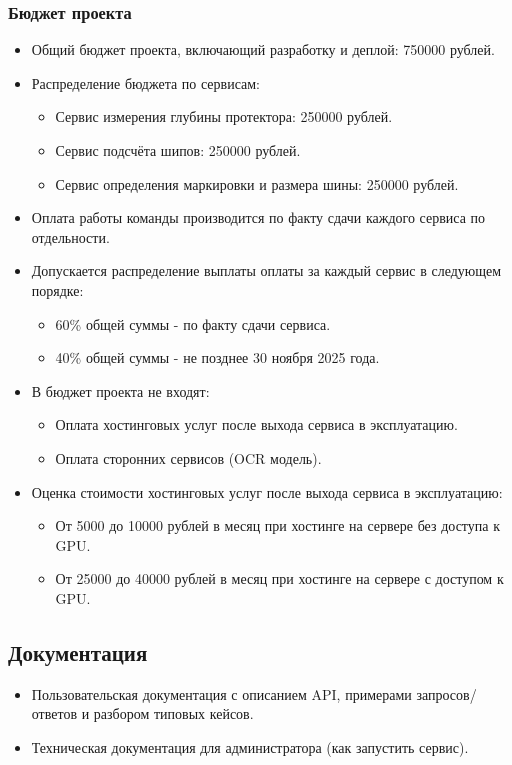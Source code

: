 \documentclass[12pt]{article}
\begin{document}
\subsubsection{Бюджет проекта}
\begin{itemize}
	\item Общий бюджет проекта, включающий разработку и деплой: 750000 рублей.
	\item Распределение бюджета по сервисам:
	      \begin{itemize}
		      \item Сервис измерения глубины протектора: 250000 рублей.
		      \item Сервис подсчёта шипов: 250000 рублей.
		      \item Сервис определения маркировки и размера шины: 250000 рублей.
	      \end{itemize}
	\item Оплата работы команды производится по факту сдачи каждого сервиса по отдельности.
	\item Допускается распределение выплаты оплаты за каждый сервис в следующем порядке:
	      \begin{itemize}
		      \item 60\% общей суммы - по факту сдачи сервиса.
		      \item 40\% общей суммы - не позднее 30 ноября 2025 года.
	      \end{itemize}
	\item В бюджет проекта не входят:
	      \begin{itemize}
		      \item Оплата хостинговых услуг после выхода сервиса в эксплуатацию.
		      \item Оплата сторонних сервисов (OCR модель).
	      \end{itemize}
	\item Оценка стоимости хостинговых услуг после выхода сервиса в эксплуатацию:
	      \begin{itemize}
		      \item От 5000 до 10000 рублей в месяц при хостинге на сервере без доступа к GPU.
		      \item От 25000 до 40000 рублей в месяц при хостинге на сервере с доступом к GPU.
	      \end{itemize}
\end{itemize}


\subsection{Документация}
\begin{itemize}
	\item Пользовательская документация с описанием API, примерами запросов/ответов и разбором типовых кейсов.
	\item Техническая документация для администратора (как запустить сервис).
\end{itemize}
\end{document}
